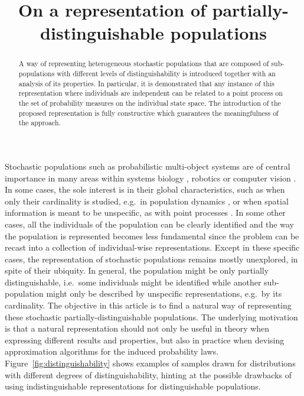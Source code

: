 \documentclass{aptpub}
\numberwithin{equation}{section}
\begin{document}
\title{On a representation of partially-distinguishable populations}


\begin{abstract}
A way of representing heterogeneous stochastic populations that are composed of sub-populations with different levels of distinguishability is introduced together with an analysis of its properties. In particular, it is demonstrated that any instance of this representation where individuals are independent can be related to a point process on the set of probability measures on the individual state space. 
The introduction of the proposed representation is fully constructive which guarantees the meaningfulness of the approach.
\end{abstract}


Stochastic populations such as probabilistic multi-object systems are of central importance in many areas within systems biology \cite{Chenouard2014}, robotics \cite{Mullane2011} or computer vision \cite{Okuma2004}. In some cases, the sole interest is in their global characteristics, such as when only their cardinality is studied, e.g.\ in population dynamics \cite{Hofbauer1998,Turchin2003}, or when spatial information is meant to be unspecific, as with point processes \cite{Geyer1994,Green1995}. In some other cases, all the individuals of the population can be clearly identified and the way the population is represented becomes less fundamental since the problem can be recast into a collection of individual-wise representations. Except in these specific cases, the representation of stochastic populations remains mostly unexplored, in spite of their ubiquity. In general, the population might be only partially distinguishable, i.e.\ some individuals might be identified while another sub-population might only be described by unspecific representations, e.g.\ by its cardinality. The objective in this article is to find a natural way of representing these stochastic partially-distinguishable populations. The underlying motivation is that a natural representation should not only be useful in theory when expressing different results and properties, but also in practice when devising approximation algorithms for the induced probability laws. Figure~\ref{fig:distinguishability} shows examples of samples drawn for distributions with different degrees of distinguishability, hinting at the possible drawbacks of using indistinguishable representations for distinguishable populations.
\end{document}
